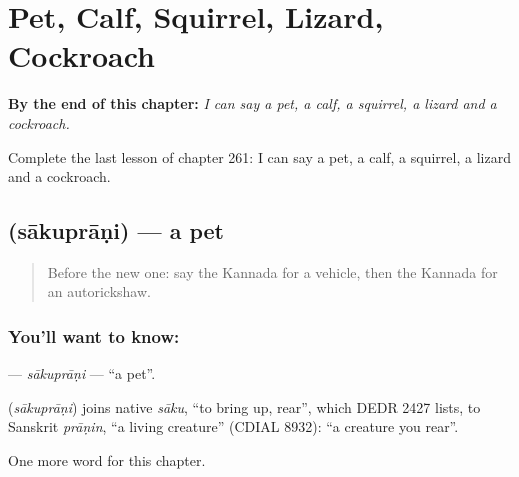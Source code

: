 
\chapter{Pet, Calf, Squirrel, Lizard, Cockroach}
\label{ch:ka-pet-calf-squirrel-lizard-cockroach}

\begin{chapteropening}
\textbf{By the end of this chapter:} \emph{I can say a pet, a calf, a squirrel, a lizard and a cockroach.}

Complete the last lesson of chapter 261: I can say a pet, a calf, a squirrel, a lizard and a cockroach.
\end{chapteropening}

\section[\texorpdfstring{\kn{ಸಾಕುಪ್ರಾಣಿ} (sākuprāṇi)}{ಸಾಕುಪ್ರಾಣಿ (sākuprāṇi)}]{ (sākuprāṇi) — a pet}

\label{lesson:KA-C261-sakuprani}



\begin{quote}
Before the new one: say the Kannada for a vehicle, then the Kannada for an autorickshaw.
\end{quote}

\subsection*{You'll want to know: }
\textbf{} — \emph{sākuprāṇi} — \textquotedblleft{}a pet\textquotedblright{}.

\begin{cousinweb}
\textbf{} (\emph{sākuprāṇi}) joins native \emph{sāku}, \textquotedblleft{}to bring up, rear\textquotedblright{}, which DEDR 2427 lists, to Sanskrit \emph{prāṇin}, \textquotedblleft{}a living creature\textquotedblright{} (CDIAL 8932): \textquotedblleft{}a creature you rear\textquotedblright{}.
\end{cousinweb}

\begin{grammarlens}[title={What you've built}]
One more word for this chapter.
\end{grammarlens}

